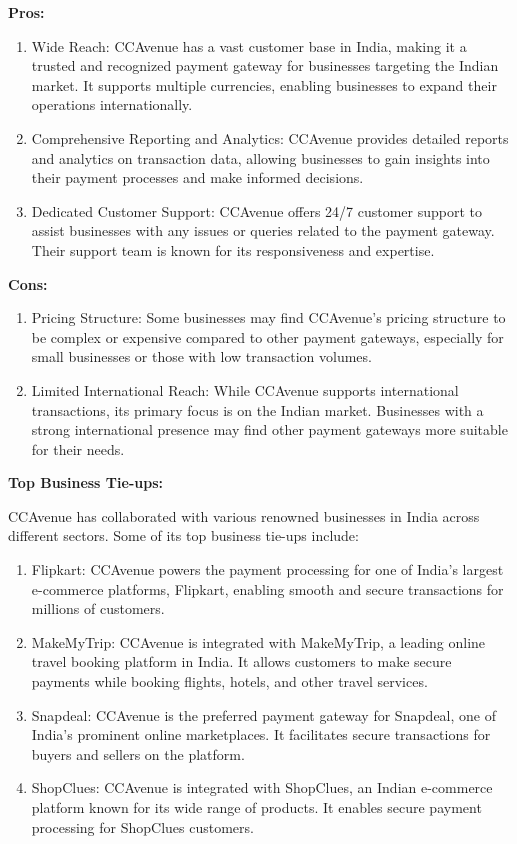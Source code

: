 \textbf{Pros:}

\begin{enumerate}
  \item Wide Reach: CCAvenue has a vast customer base in India, making it a trusted and recognized payment gateway for businesses targeting the Indian market. It supports multiple currencies, enabling businesses to expand their operations internationally.

  \item Comprehensive Reporting and Analytics: CCAvenue provides detailed reports and analytics on transaction data, allowing businesses to gain insights into their payment processes and make informed decisions.

  \item Dedicated Customer Support: CCAvenue offers 24/7 customer support to assist businesses with any issues or queries related to the payment gateway. Their support team is known for its responsiveness and expertise.
\end{enumerate}

\textbf{Cons:}

\begin{enumerate}
  \item Pricing Structure: Some businesses may find CCAvenue's pricing structure to be complex or expensive compared to other payment gateways, especially for small businesses or those with low transaction volumes.

  \item Limited International Reach: While CCAvenue supports international transactions, its primary focus is on the Indian market. Businesses with a strong international presence may find other payment gateways more suitable for their needs.
\end{enumerate}

\textbf{Top Business Tie-ups:}

CCAvenue has collaborated with various renowned businesses in India across different sectors. Some of its top business tie-ups include:

\begin{enumerate}
  \item Flipkart: CCAvenue powers the payment processing for one of India's largest e-commerce platforms, Flipkart, enabling smooth and secure transactions for millions of customers.

  \item MakeMyTrip: CCAvenue is integrated with MakeMyTrip, a leading online travel booking platform in India. It allows customers to make secure payments while booking flights, hotels, and other travel services.

  \item Snapdeal: CCAvenue is the preferred payment gateway for Snapdeal, one of India's prominent online marketplaces. It facilitates secure transactions for buyers and sellers on the platform.

  \item ShopClues: CCAvenue is integrated with ShopClues, an Indian e-commerce platform known for its wide range of products. It enables secure payment processing for ShopClues customers.
\end{enumerate}

